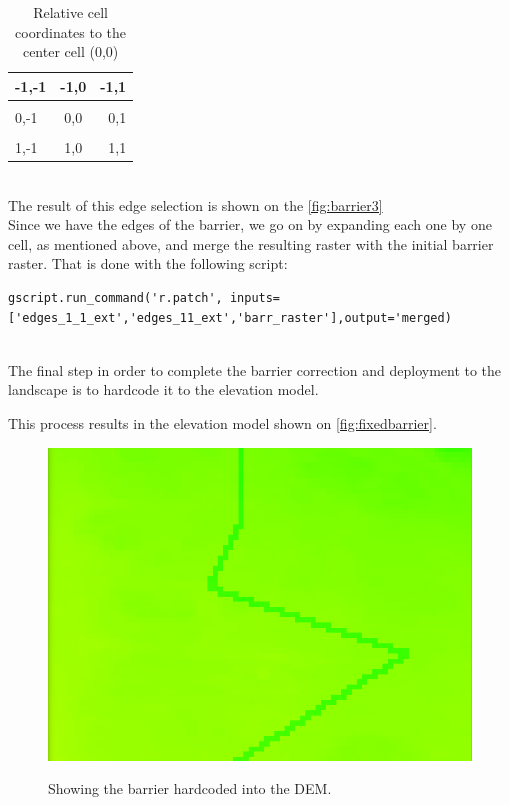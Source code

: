 \begin{table}
\centering
\begin{tabular}{l | c | r}
-1,-1 & -1,0 & -1,1 \\
\hline \\
0,-1 & 0,0 & 0,1 \\
\hline \\
1,-1 & 1,0 & 1,1 \\
\end{tabular}
\caption{Relative cell coordinates to the center cell (0,0)}
\label{tab:relcoord}
\end{table}\\

The result of this edge selection is shown on the \autoref{fig:barrier3}\\

Since we have the edges of the barrier, we go on by expanding each one by one cell, as mentioned above, and merge the resulting raster with the initial barrier raster. That is done with the following script:\\

\begin{lstlisting}
gscript.run_command('r.patch', inputs=['edges_1_1_ext','edges_11_ext','barr_raster'],output='merged)
\end{lstlisting}\\

The final step in order to complete the barrier correction and deployment to the landscape is to hardcode it to the elevation model.

This process results in the elevation model shown on \autoref{fig:fixedbarrier}.

\begin{figure}[h!]
\centering
	{\includegraphics[width=0.75\linewidth]{gfx/Phase_4/Barrier5.png}}
\caption{Showing the barrier hardcoded into the DEM.}
\label{fig:fixedbarrier}
\end{figure}

